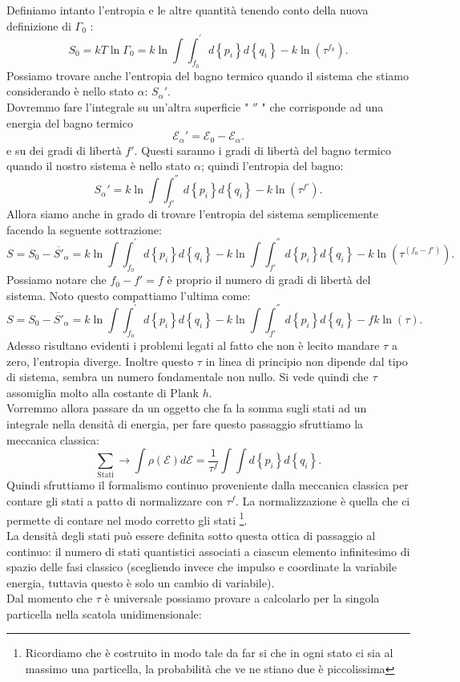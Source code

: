 Definiamo intanto l'entropia e le altre quantità tenendo conto della nuova definizione di $\Gamma_0$ :
\[
	S_0 = kT \ln\Gamma_0 = k\ln \int\int_{f_0}^{'} d\left\{ p_{i} \right\} d\left\{ q_{i} \right\} - k \ln \left( \tau^{f_0} \right) 
.\] 
Possiamo trovare anche l'entropia del bagno termico quando il sistema che stiamo considerando è nello stato $\alpha$: $S_{\alpha}'$. \\
Dovremmo fare l'integrale su un'altra superficie " $''$ " che corrisponde ad una energia del bagno termico 
\[
	\mathcal{E}_{\alpha}' = \mathcal{E}_0 - \mathcal{E}_{\alpha}
.\]
e su dei gradi di libertà $f'$. Questi saranno i gradi di libertà del bagno termico quando il nostro sistema è nello stato $\alpha$; quindi l'entropia del bagno:
\[
	S_{\alpha}' = k\ln \int\int_{f'}^{''}d\left\{ p_{i} \right\} d\left\{ q_{i} \right\} - k \ln \left( \tau^{f'} \right) 
.\] 
Allora siamo anche in grado di trovare l'entropia del sistema semplicemente facendo la seguente sottrazione:
\[
	S = S_0- \overline{S'}_{\alpha}= k \ln \int\int_{f_0}^{'}d\left\{ p_{i} \right\} d\left\{ q_{i} \right\} - k\ln \int\int_{f'}^{''}d\left\{ p_{i} \right\} d \left\{ q_i \right\} - k \ln \left( \tau^{\left( f_0-f' \right) } \right)
.\] 
Possiamo notare che $f_0- f' = f$ è proprio il numero di gradi di libertà del sistema. Noto questo compattiamo l'ultima come:
\[
	S = S_0- \overline{S'}_{\alpha}= k \ln \int\int_{f_0}^{'}d\left\{ p_{i} \right\} d\left\{ q_{i} \right\} - k\ln \int\int_{f'}^{''}d\left\{ p_{i} \right\} d \left\{ q_i \right\} - fk\ln\left( \tau \right) \label{eq:entropia1}
.\] 
Adesso risultano evidenti i problemi legati al fatto che non è lecito mandare  $\tau$ a zero, l'entropia diverge. Inoltre questo $\tau$ in linea di principio non dipende dal tipo di sistema, sembra un numero fondamentale non nullo. Si vede quindi che $\tau$ assomiglia molto alla costante di Plank $h$. \\
Vorremmo allora passare da un oggetto che fa la somma sugli stati ad un integrale nella densità di energia, per fare questo passaggio sfruttiamo la meccanica classica:
\[
	\sum_{\text{Stati}}^{} \longrightarrow \int \rho \left( \mathcal{E} \right) d\mathcal{E}=
	\frac{1}{\tau^{f}}\int\int d\left\{ p_{i} \right\} d\left\{ q_{i} \right\} 
.\] 
Quindi sfruttiamo il formalismo continuo proveniente dalla meccanica classica per contare gli stati a patto di normalizzare con $\tau^{f}$. La normalizzazione è quella che ci permette di contare nel modo corretto gli stati \footnote{Ricordiamo che è costruito in modo tale da far si che in ogni stato ci sia al massimo una particella, la probabilità che ve ne stiano due è piccolissima}. \\
La densità degli stati può essere definita sotto questa ottica di passaggio al continuo: il numero di stati quantistici associati a ciascun elemento infinitesimo di spazio delle fasi classico (scegliendo invece che impulso e coordinate la variabile energia, tuttavia questo è solo un cambio di variabile).\\
Dal momento che $\tau$ è universale possiamo provare a calcolarlo per la singola particella nella scatola unidimensionale:

